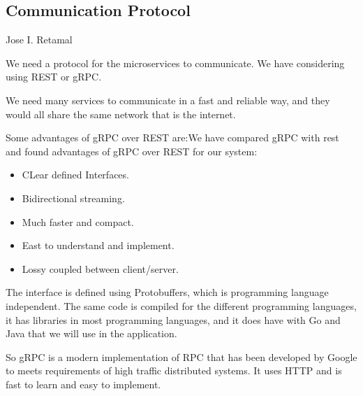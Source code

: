 \subsection{Communication Protocol}
Jose I. Retamal
\vskip 0.1in
\indent
\indent

We need a protocol for the microservices to communicate. We have considering using REST or gRPC. 

We need many services to communicate in a fast and reliable way, and they would all share the same network that is the internet.
  
Some advantages of gRPC over REST are:We have compared gRPC with rest and found  advantages of gRPC over REST for our system:

\begin{itemize}
	\item CLear defined Interfaces.
	\item Bidirectional streaming.
	\item Much faster and compact.
	\item East to understand and implement.
	\item Lossy coupled between client/server.
\end{itemize}


The interface is defined using Protobuffers, which is programming language independent. The same code is compiled for the different programming languages, it has libraries in most programming languages, and it does have with Go and Java that we will use in the application.

So gRPC is a modern implementation of RPC that has been developed by Google to meets requirements of high traffic distributed systems. It uses HTTP and is fast to learn and easy to implement.